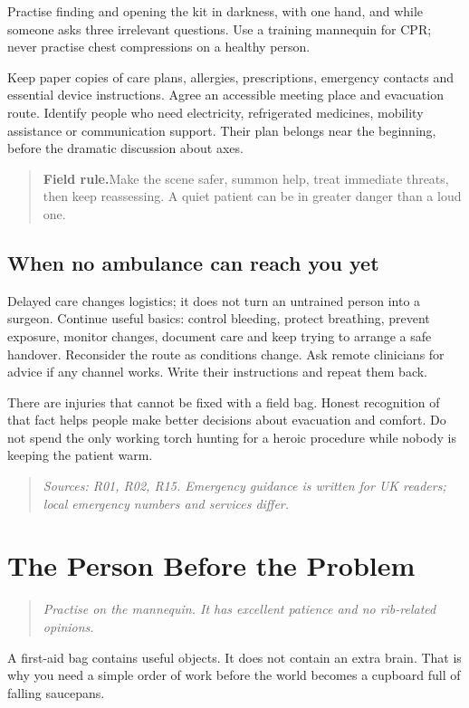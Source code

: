\documentclass[10pt,openright]{book}
\newcommand{\fieldrule}[1]{\begin{quote}\textbf{Field rule.}\enspace #1\end{quote}}
\begin{document}
Practise finding and opening the kit in darkness, with one hand, and while someone asks three irrelevant questions. Use a training mannequin for CPR; never practise chest compressions on a healthy person.

Keep paper copies of care plans, allergies, prescriptions, emergency contacts and essential device instructions. Agree an accessible meeting place and evacuation route. Identify people who need electricity, refrigerated medicines, mobility assistance or communication support. Their plan belongs near the beginning, before the dramatic discussion about axes.

\fieldrule{Make the scene safer, summon help, treat immediate threats, then keep reassessing. A quiet patient can be in greater danger than a loud one.}
\section*{When no ambulance can reach you yet}
Delayed care changes logistics; it does not turn an untrained person into a surgeon. Continue useful basics: control bleeding, protect breathing, prevent exposure, monitor changes, document care and keep trying to arrange a safe handover. Reconsider the route as conditions change. Ask remote clinicians for advice if any channel works. Write their instructions and repeat them back.

There are injuries that cannot be fixed with a field bag. Honest recognition of that fact helps people make better decisions about evacuation and comfort. Do not spend the only working torch hunting for a heroic procedure while nobody is keeping the patient warm.

\begin{quote}\emph{Sources: R01, R02, R15. Emergency guidance is written for UK readers; local emergency numbers and services differ.}\end{quote}

\chapter{The Person Before the Problem}
\begin{quote}\emph{Practise on the mannequin. It has excellent patience and no rib-related opinions.}\end{quote}
A first-aid bag contains useful objects. It does not contain an extra brain. That is why you need a simple order of work before the world becomes a cupboard full of falling saucepans.
\end{document}
